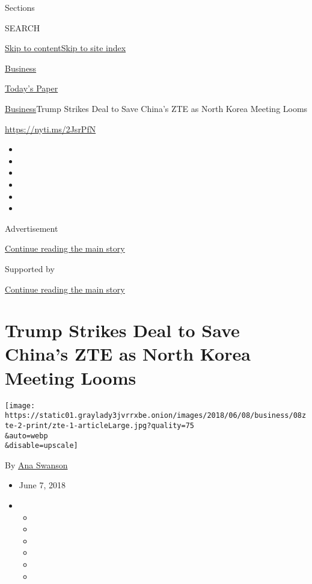 Sections

SEARCH

\protect\hyperlink{site-content}{Skip to
content}\protect\hyperlink{site-index}{Skip to site index}

\href{https://www.nytimes3xbfgragh.onion/section/business}{Business}

\href{https://myaccount.nytimes3xbfgragh.onion/auth/login?response_type=cookie\&client_id=vi}{}

\href{https://www.nytimes3xbfgragh.onion/section/todayspaper}{Today's
Paper}

\href{/section/business}{Business}\textbar{}Trump Strikes Deal to Save
China's ZTE as North Korea Meeting Looms

\url{https://nyti.ms/2JsrPfN}

\begin{itemize}
\item
\item
\item
\item
\item
\item
\end{itemize}

Advertisement

\protect\hyperlink{after-top}{Continue reading the main story}

Supported by

\protect\hyperlink{after-sponsor}{Continue reading the main story}

\hypertarget{trump-strikes-deal-to-save-chinas-zte-as-north-korea-meeting-looms}{%
\section{Trump Strikes Deal to Save China's ZTE as North Korea Meeting
Looms}\label{trump-strikes-deal-to-save-chinas-zte-as-north-korea-meeting-looms}}

\texttt{[image: https://static01.graylady3jvrrxbe.onion/images/2018/06/08/business/08zte-2-print/zte-1-articleLarge.jpg?quality=75\\\&auto=webp\\\&disable=upscale]}

By \href{https://www.nytimes3xbfgragh.onion/by/ana-swanson}{Ana Swanson}

\begin{itemize}
\item
  June 7, 2018
\item
  \begin{itemize}
  \item
  \item
  \item
  \item
  \item
  \item
  \end{itemize}
\end{itemize}

